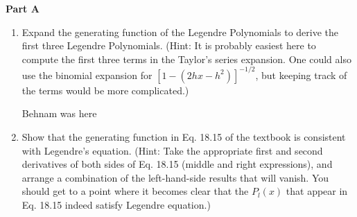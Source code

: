 \documentclass[fleqn]{article}
\begin{document}
  \textbf{Part A}
  \begin{enumerate}

    \item Expand the generating function of the Legendre Polynomials  to derive the first three Legendre Polynomials. 
    (Hint:  It is probably easiest here to compute the first three terms in the Taylor's series expansion. One could also use the binomial expansion for  $[1 -( 2hx - h^2 ) ]^{-1/2}$, but keeping track of the terms would be more complicated.)

      \textcolor{hwColor}{
        Behnam was here
      }

    \item  Show that the generating function in Eq. 18.15 of the textbook is consistent with Legendre's equation.
    (Hint: Take the appropriate first and second derivatives of both sides of Eq. 18.15 (middle and right expressions), and arrange a combination of the left-hand-side results that will vanish.  You should get to a point where it becomes clear that the $P_l(x)$ that appear in Eq. 18.15 indeed satisfy Legendre equation.)


\end{enumerate}
\end{document}
